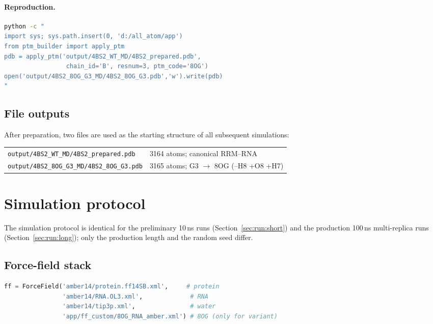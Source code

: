 \documentclass[11pt,a4paper]{article}
\begin{document}
\paragraph{Reproduction.}
\begin{lstlisting}[language=bash]
python -c "
import sys; sys.path.insert(0, 'd:/all_atom/app')
from ptm_builder import apply_ptm
pdb = apply_ptm('output/4BS2_WT_MD/4BS2_prepared.pdb',
                 chain_id='B', resnum=3, ptm_code='8OG')
open('output/4BS2_8OG_G3_MD/4BS2_8OG_G3.pdb','w').write(pdb)
"
\end{lstlisting}

\subsection{File outputs}
After preparation, two files are used as the starting structure of all
subsequent simulations:

\begin{tabular}{ll}
\toprule
\texttt{output/4BS2\_WT\_MD/4BS2\_prepared.pdb} & 3164 atoms; canonical RRM--RNA \\
\texttt{output/4BS2\_8OG\_G3\_MD/4BS2\_8OG\_G3.pdb} & 3165 atoms; G3 $\rightarrow$ 8OG (--H8 +O8 +H7) \\
\bottomrule
\end{tabular}

\section{Simulation protocol}
\label{sec:run}

The simulation protocol is identical for the preliminary 10\,ns runs
(Section~\ref{sec:run:short}) and the production 100\,ns multi-replica
runs (Section~\ref{sec:run:long}); only the production length and the
random seed differ.

\subsection{Force-field stack}
\begin{lstlisting}[language=python]
ff = ForceField('amber14/protein.ff14SB.xml',     # protein
                'amber14/RNA.OL3.xml',             # RNA
                'amber14/tip3p.xml',               # water
                'app/ff_custom/8OG_RNA_amber.xml') # 8OG (only for variant)
\end{lstlisting}
\end{document}
